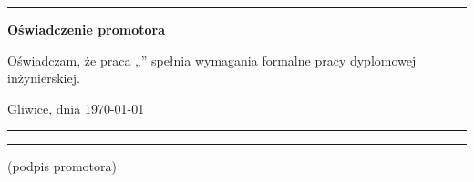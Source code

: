 
\cleardoublepage

\rule{1cm}{0cm}

\vfill

\begin{center}
	\Large\bfseries Oświadczenie promotora
\end{center}

\vfill

Oświadczam, że praca „\tytul” spełnia wymagania formalne pracy dyplomowej inżynierskiej.

\vfill



\vfill

Gliwice, dnia \today

\rule{0.5\textwidth}{0cm}\dotfill

\rule{0.5\textwidth}{0cm}
\begin{minipage}{0.45\textwidth}
	{\begin{center}(podpis promotora)\end{center}}
\end{minipage}

\vfill



\cleardoublepage
